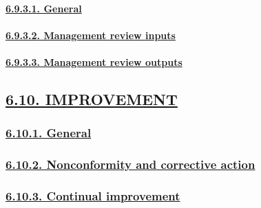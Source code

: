\documentclass[
]{article}
\begin{document}
\hypertarget{general-7}{%
\paragraph{\texorpdfstring{\protect\hyperlink{general-16}{6.9.3.1.
General}}{6.9.3.1. General}}\label{general-7}}

\hypertarget{management-review-inputs}{%
\paragraph{\texorpdfstring{\protect\hyperlink{management-review-inputs-1}{6.9.3.2.
Management review
inputs}}{6.9.3.2. Management review inputs}}\label{management-review-inputs}}

\hypertarget{management-review-outputs}{%
\paragraph{\texorpdfstring{\protect\hyperlink{management-review-outputs-1}{6.9.3.3.
Management review
outputs}}{6.9.3.3. Management review outputs}}\label{management-review-outputs}}

\hypertarget{improvement}{%
\subsection{\texorpdfstring{\protect\hyperlink{improvement-1}{6.10.
IMPROVEMENT}}{6.10. IMPROVEMENT}}\label{improvement}}

\hypertarget{general-8}{%
\subsubsection{\texorpdfstring{\protect\hyperlink{general-17}{6.10.1.
General}}{6.10.1. General}}\label{general-8}}

\hypertarget{nonconformity-and-corrective-action}{%
\subsubsection{\texorpdfstring{\protect\hyperlink{nonconformity-and-corrective-action-1}{6.10.2.
Nonconformity and corrective
action}}{6.10.2. Nonconformity and corrective action}}\label{nonconformity-and-corrective-action}}

\hypertarget{continual-improvement}{%
\subsubsection{\texorpdfstring{\protect\hyperlink{continual-improvement-1}{6.10.3.
Continual
improvement}}{6.10.3. Continual improvement}}\label{continual-improvement}}
\end{document}
